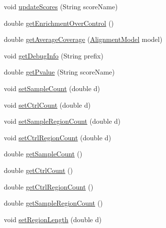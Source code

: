 \begin{DoxyCompactItemize}
\item 
void \hyperlink{classumms_1_1core_1_1model_1_1score_1_1_multi_score_a7df79038cede0780eb697052c6bad5ec}{update\+Scores} (String score\+Name)
\item 
double \hyperlink{classumms_1_1core_1_1model_1_1score_1_1_multi_score_a9124cf6e020fd07b4864eff3f7353a53}{get\+Enrichment\+Over\+Control} ()
\item 
double \hyperlink{classumms_1_1core_1_1model_1_1score_1_1_multi_score_a414f3019395acb555de36ce124778e2b}{get\+Average\+Coverage} (\hyperlink{classumms_1_1core_1_1model_1_1_alignment_model}{Alignment\+Model} model)
\item 
void \hyperlink{classumms_1_1core_1_1model_1_1score_1_1_multi_score_a14cdd68e8c1bc594f39badfc1c1bcde5}{get\+Debug\+Info} (String prefix)
\item 
double \hyperlink{classumms_1_1core_1_1model_1_1score_1_1_multi_score_aaff32cc152311616f6c10cb55c7849c6}{get\+Pvalue} (String score\+Name)
\item 
void \hyperlink{classumms_1_1core_1_1model_1_1score_1_1_multi_score_aca14502ed9e3480235fc113a4d205541}{set\+Sample\+Count} (double d)
\item 
void \hyperlink{classumms_1_1core_1_1model_1_1score_1_1_multi_score_a7c8b8a89df6913ec391ecbc21328b6b0}{set\+Ctrl\+Count} (double d)
\item 
void \hyperlink{classumms_1_1core_1_1model_1_1score_1_1_multi_score_aed5f43ead6121b5314edbf0861165631}{set\+Sample\+Region\+Count} (double d)
\item 
void \hyperlink{classumms_1_1core_1_1model_1_1score_1_1_multi_score_a8be96706ce0566b740b6f6b72398d418}{set\+Ctrl\+Region\+Count} (double d)
\item 
double \hyperlink{classumms_1_1core_1_1model_1_1score_1_1_multi_score_aafd9d746298556ecbd1b365d349ffe13}{get\+Sample\+Count} ()
\item 
double \hyperlink{classumms_1_1core_1_1model_1_1score_1_1_multi_score_a963a7d6c8fd0ce0e23ffcf5c63f00c3a}{get\+Ctrl\+Count} ()
\item 
double \hyperlink{classumms_1_1core_1_1model_1_1score_1_1_multi_score_acd956420ecd37565d440797f56bf7018}{get\+Ctrl\+Region\+Count} ()
\item 
double \hyperlink{classumms_1_1core_1_1model_1_1score_1_1_multi_score_ac53520acee3ce90901ec454a491fdb61}{get\+Sample\+Region\+Count} ()
\item 
void \hyperlink{classumms_1_1core_1_1model_1_1score_1_1_multi_score_a612072d77935b81ca8bb0295ee95115d}{set\+Region\+Length} (double d)

\end{DoxyCompactItemize}
